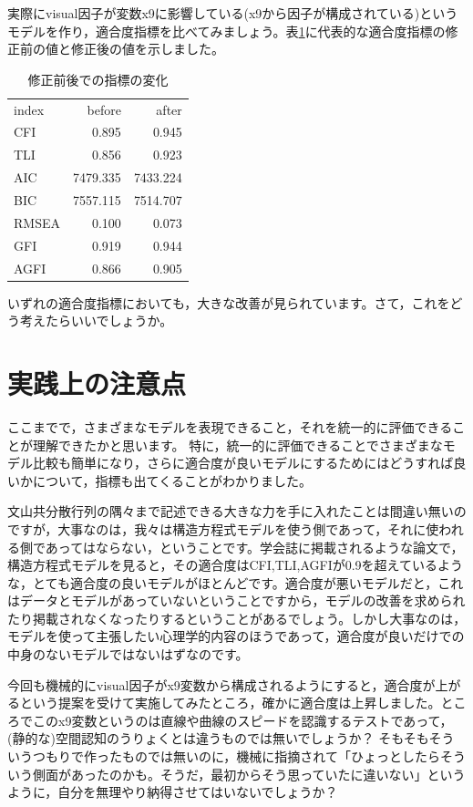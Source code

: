 \documentclass{ltjsbook}
\begin{document}
実際にvisual因子が変数x9に影響している(x9から因子が構成されている)というモデルを作り，適合度指標を比べてみましょう。表\ref{tab:13_03}に代表的な適合度指標の修正前の値と修正後の値を示しました。
\begin{table}
    \caption{修正前後での指標の変化}
    \centering
    \begin{tabular}[t]{l|rr}
    \hline
    index & before & after\\
    CFI & 0.895 & 0.945\\
    TLI & 0.856 & 0.923\\
    AIC & 7479.335 & 7433.224\\
    BIC & 7557.115 & 7514.707\\
    RMSEA & 0.100 & 0.073\\
    GFI & 0.919 & 0.944\\
    AGFI & 0.866 & 0.905\\
    \hline
    \end{tabular}
    \label{tab:13_03}
    \end{table}
いずれの適合度指標においても，大きな改善が見られています。さて，これをどう考えたらいいでしょうか。

\section{実践上の注意点}
ここまでで，さまざまなモデルを表現できること，それを統一的に評価できることが理解できたかと思います。
特に，統一的に評価できることでさまざまなモデル比較も簡単になり，さらに適合度が良いモデルにするためにはどうすれば良いかについて，指標も出てくることがわかりました。

文山共分散行列の隅々まで記述できる大きな力を手に入れたことは間違い無いのですが，大事なのは，我々は構造方程式モデルを使う側であって，それに使われる側であってはならない，ということです。学会誌に掲載されるような論文で，構造方程式モデルを見ると，その適合度はCFI,TLI,AGFIが0.9を超えているような，とても適合度の良いモデルがほとんどです。適合度が悪いモデルだと，これはデータとモデルがあっていないということですから，モデルの改善を求められたり掲載されなくなったりするということがあるでしょう。しかし大事なのは，モデルを使って主張したい心理学的内容のほうであって，適合度が良いだけでの中身のないモデルではないはずなのです。

今回も機械的にvisual因子がx9変数から構成されるようにすると，適合度が上がるという提案を受けて実施してみたところ，確かに適合度は上昇しました。ところでこのx9変数というのは直線や曲線のスピードを認識するテストであって，(静的な)空間認知のうりょくとは違うものでは無いでしょうか？ そもそもそういうつもりで作ったものでは無いのに，機械に指摘されて「ひょっとしたらそういう側面があったのかも。そうだ，最初からそう思っていたに違いない」というように，自分を無理やり納得させてはいないでしょうか？ 
\end{document}
